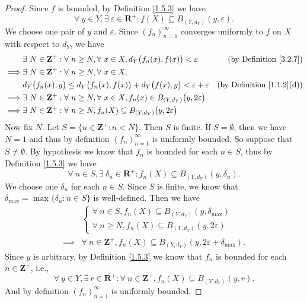 \begin{proof}
    Since \(f\) is bounded, by Definition \ref{1.5.3} we have
    \[
        \forall\ y \in Y, \exists\ \varepsilon \in \mathbf{R}^+ : f(X) \subseteq B_{(Y, d_Y)}(y, \varepsilon).
    \]
    We choose one pair of \(y\) and \(\varepsilon\).
    Since \((f_n)_{n = 1}^\infty\) converges uniformly to \(f\) on \(X\) with respect to \(d_Y\), we have
    \begin{align*}
                 & \exists\ N \in \mathbf{Z}^+ : \forall\ n \geq N, \forall\ x \in X, d_Y\big(f_n(x), f(x)\big) < \varepsilon          & \text{(by Definition \ref{3.2.7})}    \\
        \implies & \exists\ N \in \mathbf{Z}^+ : \forall\ n \geq N, \forall\ x \in X,                                                                                          \\
                 & d_Y\big(f_n(x), y\big) \leq d_Y\big(f_n(x), f(x)\big) + d_Y\big(f(x), y\big) < \varepsilon + \varepsilon            & \text{(by Definition \ref{1.1.2}(d))} \\
        \implies & \exists\ N \in \mathbf{Z}^+ : \forall\ n \geq N, \forall\ x \in X, f_n(x) \in B_{(Y, d_Y)}\big(y, 2\varepsilon\big)                                         \\
        \implies & \exists\ N \in \mathbf{Z}^+ : \forall\ n \geq N, f_n(X) \subseteq B_{(Y, d_Y)}\big(y, 2\varepsilon\big)
    \end{align*}
    Now fix \(N\).
    Let \(S = \{n \in \mathbf{Z}^+ : n < N\}\).
    Then \(S\) is finite.
    If \(S = \emptyset\), then we have \(N = 1\) and thus by definition \((f_n)_{n = 1}^\infty\) is uniformly bounded.
    So suppose that \(S \neq \emptyset\).
    By hypothesis we know that \(f_n\) is bounded for each \(n \in S\), thus by Definition \ref{1.5.3} we have
    \[
        \forall\ n \in S, \exists\ \delta_n \in \mathbf{R}^+ : f_n(X) \subseteq B_{(Y, d_Y)}(y, \delta_n).
    \]
    We choose one \(\delta_n\) for each \(n \in S\).
    Since \(S\) is finite, we know that \(\delta_{\max} = \max\{\delta_n : n \in S\}\) is well-defined.
    Then we have
    \begin{align*}
                 & \begin{cases}
            \forall\ n \in S, f_n(X) \subseteq B_{(Y, d_Y)}(y, \delta_{\max}) \\
            \forall\ n \geq N, f_n(X) \subseteq B_{(Y, d_Y)}(y, 2\varepsilon)
        \end{cases}                                                                   \\
        \implies & \forall\ n \in \mathbf{Z}^+, f_n(X) \subseteq B_{(Y, d_Y)}(y, 2\varepsilon + \delta_{\max}).
    \end{align*}
    Since \(y\) is arbitrary, by Definition \ref{1.5.3} we know that \(f_n\) is bounded for each \(n \in \mathbf{Z}^+\), i.e.,
    \[
        \forall\ y \in Y, \exists\ r \in \mathbf{R}^+ : \forall\ n \in \mathbf{Z}^+, f_n(X) \subseteq B_{(Y, d_Y)}(y, r).
    \]
    And by definition \((f_n)_{n = 1}^\infty\) is uniformly bounded.
\end{proof}